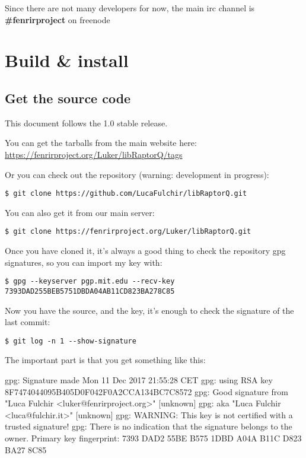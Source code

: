 \documentclass[11pt,a4paper]{refart}
\begin{document}
 Since there are not many developers for now, the main irc channel is \textbf{\#fenrirproject} on freenode


\section{Build \& install}
\subsection{Get the source code}
This document follows the 1.0 stable release.

You can get the tarballs from the main website here:\\
\href{https://fenrirproject.org/Luker/libRaptorQ/tags}{https://fenrirproject.org/Luker/libRaptorQ/tags}

Or you can check out the repository (warning: development in progress):

\begin{verbatim}
$ git clone https://github.com/LucaFulchir/libRaptorQ.git
\end{verbatim}

You can also get it from our main server:

\begin{verbatim}
$ git clone https://fenrirproject.org/Luker/libRaptorQ.git
\end{verbatim}

Once you have cloned it, it's always a good thing to check the repository gpg
signatures, so you can import my key with:

\begin{verbatim}
$ gpg --keyserver pgp.mit.edu --recv-key 7393DAD255BEB5751DBDA04AB11CD823BA278C85
\end{verbatim}


Now you have the source, and the key, it's enough to check the signature of the
last commit:

\begin{verbatim}
$ git log -n 1 --show-signature
\end{verbatim}

The important part is that you get something like this:

\begin{verbbox}[\footnotesize]
 gpg: Signature made Mon 11 Dec 2017 21:55:28 CET
 gpg:                using RSA key 8F7474044095B405D0F042F0A2CCA134BC7C8572
 gpg: Good signature from "Luca Fulchir <luker@fenrirproject.org>" [unknown]
 gpg:                 aka "Luca Fulchir <luca@fulchir.it>" [unknown]
 gpg: WARNING: This key is not certified with a trusted signature!
 gpg:          There is no indication that the signature belongs to the owner.
 Primary key fingerprint: 7393 DAD2 55BE B575 1DBD A04A B11C D823 BA27 8C85
\end{verbbox}
\theverbbox
\end{document}
